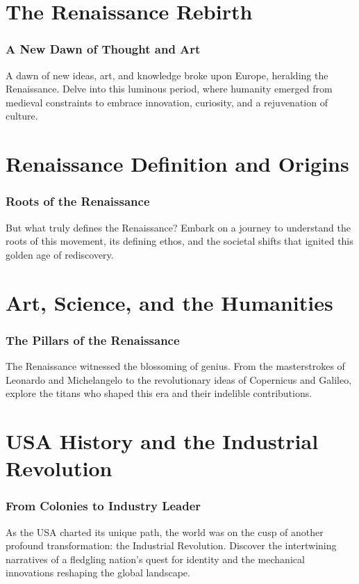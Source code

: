 \documentclass[a4paper,12pt]{book}
\begin{document}
\chapter{The Renaissance Rebirth}
\subsection*{A New Dawn of Thought and Art}
A dawn of new ideas, art, and knowledge broke upon Europe, heralding the Renaissance. Delve into this luminous period, where humanity emerged from medieval constraints to embrace innovation, curiosity, and a rejuvenation of culture.

\chapter{Renaissance Definition and Origins}
\subsection*{Roots of the Renaissance}
But what truly defines the Renaissance? Embark on a journey to understand the roots of this movement, its defining ethos, and the societal shifts that ignited this golden age of rediscovery.

\chapter{Art, Science, and the Humanities}
\subsection*{The Pillars of the Renaissance}
The Renaissance witnessed the blossoming of genius. From the masterstrokes of Leonardo and Michelangelo to the revolutionary ideas of Copernicus and Galileo, explore the titans who shaped this era and their indelible contributions.



\chapter{USA History and the Industrial Revolution}
\subsection*{From Colonies to Industry Leader}
As the USA charted its unique path, the world was on the cusp of another profound transformation: the Industrial Revolution. Discover the intertwining narratives of a fledgling nation's quest for identity and the mechanical innovations reshaping the global landscape.
\end{document}
